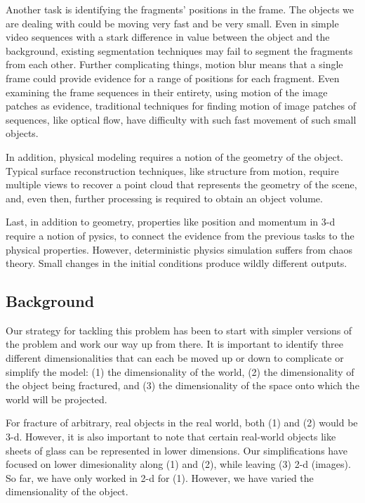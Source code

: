 \documentclass[10pt,twocolumn,letterpaper]{article}
\begin{document}
Another task is identifying the fragments’ positions in the frame. The objects 
we are dealing with could be moving very fast and be 
very small. Even in simple video sequences with a stark difference in value 
between the object and the background, existing segmentation techniques may fail 
to segment the fragments from each other. Further complicating 
things, motion blur 
means that a single frame could provide evidence for a range of positions for 
each fragment. Even examining the frame sequences in their entirety, using 
motion of the image patches as evidence, traditional techniques for finding motion of 
image patches of sequences, like optical flow, have 
difficulty with such fast movement of such small objects.

In addition, physical modeling requires a notion of the geometry of the object. Typical 
surface reconstruction techniques, like structure from motion, require multiple 
views to recover a point cloud that represents the geometry of the scene, and, 
even then, further processing is required to obtain an object volume.

Last, in addition to geometry, properties like position and momentum in 
3-d require a notion of pysics, to connect the evidence from the previous tasks 
to the physical properties. However, deterministic physics simulation suffers 
from chaos theory. Small changes in the initial conditions produce wildly 
different outputs.

\subsection{Background}

Our strategy for tackling this problem has been to start with simpler versions 
of the problem and work our way up from there. It is important to identify three 
different dimensionalities that can each be moved up or down to complicate or 
simplify the model: (1) the dimensionality of the world, (2) the 
dimensionality of the object being fractured, and (3) the dimensionality of the 
space onto which the world will be projected.

For fracture of arbitrary, real objects in the real world, both (1) and (2) 
would be 3-d. However, it is also important to note that certain real-world 
objects like sheets of glass can be represented in lower dimensions. Our 
simplifications have focused on lower dimesionality along (1) and (2), while 
leaving (3) 2-d (images). So far, we have only worked in 2-d for (1). However, 
we have varied the dimensionality of the object.
\end{document}
